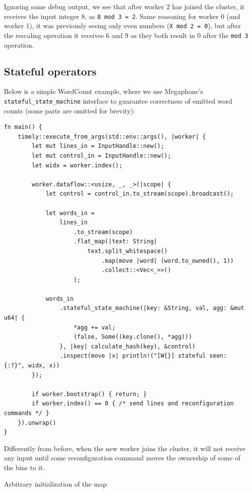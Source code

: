 \documentclass[12pt]{extarticle}
\begin{document}
Ignoring some debug output, we see that after worker 2 has joined the cluster, it receives the input integer 8,
as \verb|8 mod 3 = 2|. Same reasoning for worker 0 (and worker 1), it was previously seeing only even numbers
(\verb|X mod 2 = 0|), but after the rescaling operation it receives 6 and 9 as they both result in 0 after the \verb|mod 3|
operation.

\subsection{Stateful operators}

Below is a simple WordCount example, where we use Megaphone's \verb|stateful_state_machine|
interface to guarantee correctness of emitted word counts (some parts are omitted for brevity):

\begin{verbatim}
fn main() {
    timely::execute_from_args(std::env::args(), |worker| {
        let mut lines_in = InputHandle::new();
        let mut control_in = InputHandle::new();
        let widx = worker.index();

        worker.dataflow::<usize, _, _>(|scope| {
            let control = control_in.to_stream(scope).broadcast();

            let words_in =
                lines_in
                    .to_stream(scope)
                    .flat_map(|text: String|
                        text.split_whitespace()
                            .map(move |word| (word.to_owned(), 1))
                            .collect::<Vec<_>>()
                    );

            words_in
                .stateful_state_machine(|key: &String, val, agg: &mut u64| {
                    *agg += val;
                    (false, Some((key.clone(), *agg)))
                }, |key| calculate_hash(key), &control)
                .inspect(move |x| println!("[W{}] stateful seen: {:?}", widx, x))
        });

        if worker.bootstrap() { return; }
        if worker.index() == 0 { /* send lines and reconfiguration commands */ }
    }).unwrap()
}
\end{verbatim}


Differently from before, when the new worker joins the cluster, it will not receive any input until
some reconfiguration command moves the ownership of some of the bins to it.

Arbitrary initialization of the map 
\end{document}
